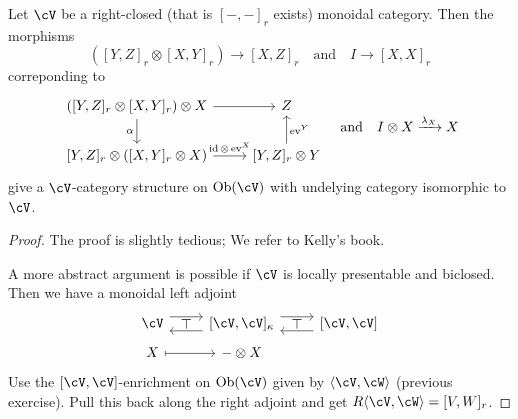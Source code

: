 \documentclass[a4paper,11pt,oneside,openany]{scrbook}
\begin{document}
\begin{prop}
	Let $ \cV $ be a right-closed (that is $ [-,-]_r $ exists) monoidal category.
	Then the morphisms
	\begin{displaymath}
		([Y,Z]_r \otimes [X,Y]_r ) \to [X,Z]_r \quad \text{and} \quad I \to [X,X]_r
	\end{displaymath}
	correponding to
	\begin{displaymath}
		\begin{tikzcd}
			([Y,Z]_r \otimes [X,Y]_r) \otimes X \arrow[r]\arrow[d, "\alpha"'] & Z \\
			\lbrack Y,Z\rbrack_r \otimes ([X,Y]_r \otimes X) \arrow[r, "\id\otimes \ev^X"]  & \lbrack Y,Z\rbrack_r\otimes Y \arrow[u, "\ev^Y"']
		\end{tikzcd}\quad \text{and}\quad
		I\otimes X \xrightarrow{\lambda_X} X
	\end{displaymath}
	give a $ \cV $-category structure on $ \Ob(\cV) $ with undelying category isomorphic to $ \cV $.
\end{prop}
\begin{proof}
	The proof is slightly tedious; We refer to Kelly's book.

	A more abstract argument is possible if $ \cV $ is locally presentable and biclosed.
	Then we have a monoidal left adjoint
	\begin{displaymath}
		\begin{tikzcd}[row sep = tiny]
			\cV
			\arrow[r, shift left=.5em] \arrow[from=r, shift left=.5em] \arrow[r,phantom, "\top"]
			& \lbrack \cV,\cV\rbrack_{\kappa}
			\arrow[r, shift left=.5em]
			\arrow[from=r, shift left=.5em]
			\arrow[r,phantom, "\top"]
			& \lbrack \cV ,\cV \rbrack\\
			X \arrow[mapsto, r] & -\otimes X
		\end{tikzcd}
	\end{displaymath}
	Use the $ [\cV,\cV] $-enrichment on $ \Ob(\cV) $ given by $ \langle\cV,\cW\rangle $ (previous exercise).
	Pull this back along the right adjoint and get $ R\langle \cV,\cW\rangle = [V,W]_r $.
\end{proof}
\end{document}
